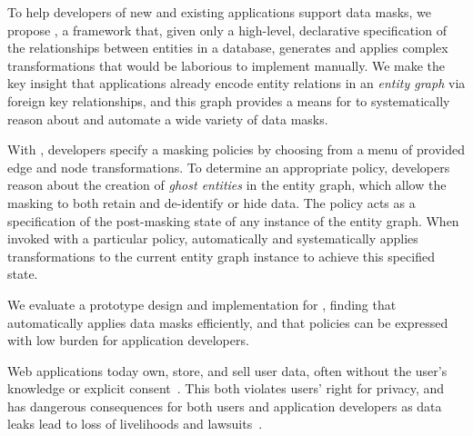 To help developers of new and existing applications support data masks, we propose
\sys, a framework that, given only a high-level, declarative specification of the relationships
between entities in a database, generates and applies complex transformations that would be
laborious to implement manually. We make the key insight that applications already encode entity
relations in an \emph{entity graph} via foreign key relationships, and this graph provides a means
for \sys to systematically reason about and automate a wide variety of data masks.

With \sys, developers specify a masking policies by choosing from a menu of provided edge and
node transformations. To determine an appropriate policy, developers reason about the creation of
\emph{ghost entities} in the entity graph, which allow the masking to both retain and
de-identify or hide data. The policy acts as a specification of the post-masking state of any
instance of the entity graph. When invoked with a particular policy, \sys automatically and
systematically applies transformations to the current entity graph instance to achieve this
specified state.

We evaluate a prototype design and implementation for \sys, finding that \sys automatically applies
data masks efficiently, and that policies can be expressed with low burden for application
developers.

\iffalse
%
%
Web applications today own, store, and sell user data, often without the user's knowledge or
explicit consent~\cite{nytimes:fb, npr:data}. This both violates users' right for privacy, and has
dangerous consequences for both users and application developers as data leaks lead to loss of
livelihoods and lawsuits~\cite{breach:amazon,breach:twitter, breach:fb, breach:marriott,
breach:quora}. 

